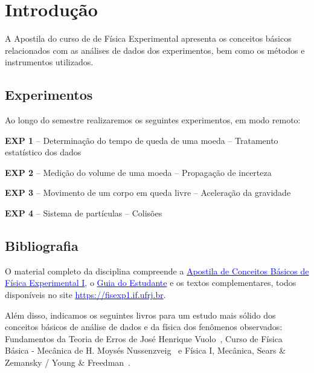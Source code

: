 \chapter*{Introdução}\vspace{-1.5cm}
A Apostila do curso de de Física Experimental apresenta 
os conceitos b\'asicos relacionados com as análises de dados dos experimentos, bem como os métodos e instrumentos utilizados.
\vspace{-0.5cm}
\section*{Experimentos}

Ao longo do semestre realizaremos os seguintes experimentos, em  modo remoto:

\begin{descrip}
\item[\bf EXP 1] -- Determinação do tempo de queda de uma moeda -- Tratamento estatístico dos dados
\item[\bf EXP 2] -- Medição do volume de uma moeda -- Propagação de incerteza
\item[\bf EXP 3] -- Movimento de um corpo em queda livre -- Aceleração da gravidade 
\item[\bf EXP 4] -- Sistema de partículas -- Colisões 
\end{descrip}



\vspace{-0.5cm}
\section*{Bibliografia}

O material completo da disciplina compreende a \href{https://fisexp1.if.ufrj.br/wp-content/uploads/2020/08/Apostila-1.pdf}{\textcolor {blue}
{Apostila de Conceitos Básicos de Física Experimental I}}, o  
\href{https://fisexp1.if.ufrj.br/wp-content/uploads/2020/08/GuiadoEstudante-2.pdf} {\textcolor {blue}
{Guia do Estudante}}
 e os textos complementares, todos disponí­veis no site \href{https://fisexp1.if.ufrj.br/}{\textcolor {blue}
{https://fisexp1.if.ufrj.br}}.


 
 Além disso, indicamos os seguintes livros para um estudo mais sólido dos conceitos básicos de análise de dados e da física dos fenômenos observados: Fundamentos da Teoria de Erros de José Henrique Vuolo~\cite{Vuolo},
 Curso de Fí­sica Básica - Mecânica de H. Moysés Nussenzveig~\cite{Moyses}
 e Fí­sica I, Mecânica, Sears \& Zemansky / Young \& Freedman~\cite{SearsZemansky}.